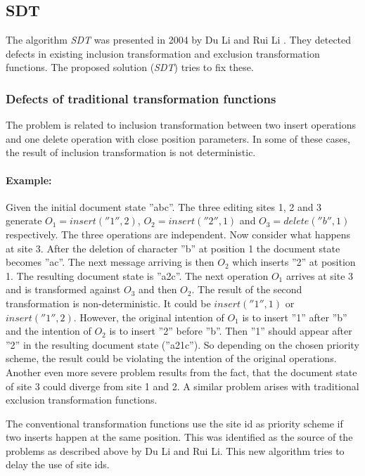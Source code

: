 \subsection{SDT}
\label{algo:sdt}

The algorithm \emph{SDT} was presented in 2004 by Du Li and Rui Li \cite{sdt}. They detected defects in existing inclusion transformation and exclusion transformation functions. The proposed solution (\emph{SDT}) tries to fix these.

\subsubsection{Defects of traditional transformation functions}
The problem is related to inclusion transformation between two insert operations and one delete operation with close position parameters. In some of these cases, the result of inclusion transformation is not deterministic. 

\paragraph{Example: } Given the initial document state ''abc''. The three editing sites 1, 2 and 3 generate $O_{1} = insert(''1'',2)$, $O_{2} = insert(''2'',1)$ and $O_{3} = delete(''b'',1)$ respectively. The three operations are independent. Now consider what happens at site 3. After the deletion of character ''b'' at position 1 the document state becomes ''ac''. The next message arriving is then $O_{2}$ which inserts ''2'' at position 1. The resulting document state is ''a2c''. The next operation $O_{1}$ arrives at site 3 and is transformed against $O_{3}$ and then $O_{2}$. The result of the second transformation is non-deterministic. It could be $insert(''1'',1)$ or $insert(''1'',2)$. However, the original intention of $O_{1}$ is to insert ''1'' after ''b'' and the intention of $O_{2}$ is to insert ''2'' before ''b''. Then ''1'' should appear after ''2'' in the resulting document state (''a21c''). So depending on the chosen priority scheme, the result could be violating the intention of the original operations. Another even more severe problem results from the fact, that the document state of site 3 could diverge from site 1 and 2. A similar problem arises with traditional exclusion transformation functions.

The conventional transformation functions use the site id as priority scheme if two inserts happen at the same position. This was identified as the source of the problems as described above by Du Li and Rui Li. This new algorithm tries to delay the use of site ids.


